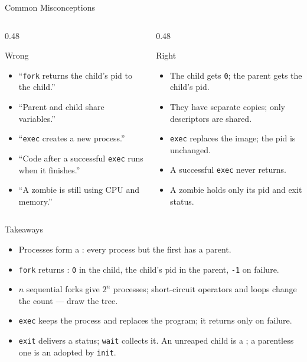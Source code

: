 \documentclass[aspectratio=169]{beamer}
\begin{document}
\begin{frame}{Common Misconceptions}
  \begin{columns}[T]
    \begin{column}{0.48\textwidth}
      \begin{block}{Wrong}
        \begin{itemize}
          \item ``\texttt{fork} returns the child's pid to the child.''
          \item ``Parent and child share variables.''
          \item ``\texttt{exec} creates a new process.''
          \item ``Code after a successful \texttt{exec} runs when it
            finishes.''
          \item ``A zombie is still using CPU and memory.''
        \end{itemize}
      \end{block}
    \end{column}
    \begin{column}{0.48\textwidth}
      \begin{block}{Right}
        \begin{itemize}
          \item The child gets \texttt{0}; the parent gets the child's pid.
          \item They have separate copies; only descriptors are shared.
          \item \texttt{exec} replaces the image; the pid is unchanged.
          \item A successful \texttt{exec} never returns.
          \item A zombie holds only its pid and exit status.
        \end{itemize}
      \end{block}
    \end{column}
  \end{columns}
\end{frame}

\begin{frame}{Takeaways}
  \begin{itemize}
    \item Processes form a : every process but the first has a
      parent.
    \item \texttt{fork} returns : \texttt{0} in the child, the
      child's pid in the parent, \texttt{-1} on failure.
    \item $n$ sequential forks give $2^n$ processes; short-circuit operators
      and loops change the count --- draw the tree.
    \item \texttt{exec} keeps the process and replaces the program; it returns
      only on failure.
    \item \texttt{exit} delivers a status; \texttt{wait} collects it. An
      unreaped child is a ; a parentless one is an 
      adopted by \texttt{init}.
  \end{itemize}
\end{frame}
\end{document}
